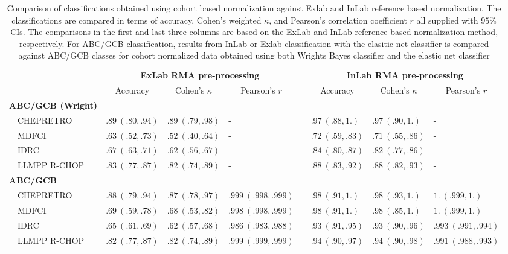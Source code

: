 \documentclass[10pt,letterpaper]{article}
\begin{document}
%
\begin{table}[!tbp]
	\begin{adjustwidth}{-1in}{0in}
		{\scriptsize
			\caption{Comparison of classifications obtained using cohort based
				normalization against Exlab and InLab reference based normalization.
				The classifications are compared in terms of accuracy,
				Cohen's weighted $\kappa$, and Pearson's correlation coefficient $r$ all
				supplied with $95\%$ CIs. The comparisons in the first and last three columns
				are based on the ExLab and InLab reference based
				normalization method, respectively. For ABC/GCB classification, results
				from InLab or Exlab classification with the elasitic net classifier is 
				compared against ABC/GCB classes for cohort normalized data obtained using both
				Wrights Bayes classifier and the elastic net classifier\label{tab:classALL}} 
			\begin{center}
				\begin{tabular}{llllclll}
					\hline\hline
					\multicolumn{1}{l}{\bfseries }&\multicolumn{3}{c}{\bfseries ExLab RMA pre-processing}&\multicolumn{1}{c}{\bfseries }&\multicolumn{3}{c}{\bfseries InLab RMA pre-processing}\tabularnewline
					\cline{2-4} \cline{6-8}
					\multicolumn{1}{l}{}&\multicolumn{1}{c}{Accuracy}&\multicolumn{1}{c}{Cohen's $\kappa$}&\multicolumn{1}{c}{Pearson's $r$}&\multicolumn{1}{c}{}&\multicolumn{1}{c}{Accuracy}&\multicolumn{1}{c}{Cohen's $\kappa$}&\multicolumn{1}{c}{Pearson's $r$}\tabularnewline
					\hline
					{\bfseries ABC/GCB (Wright)}&&&&&&&\tabularnewline
					~~CHEPRETRO&$.89~(.80, .94)$&$.89~(.79, .98)$&-&&$.97~(.88, 1.)$&$.97~(.90, 1.)$&-\tabularnewline
					~~MDFCI&$.63~(.52, .73)$&$.52~(.40, .64)$&-&&$.72~(.59, .83)$&$.71~(.55, .86)$&-\tabularnewline
					~~IDRC&$.67~(.63, .71)$&$.62~(.56, .67)$&-&&$.84~(.80, .87)$&$.82~(.77, .86)$&-\tabularnewline
					~~LLMPP R-CHOP&$.83~(.77, .87)$&$.82~(.74, .89)$&-&&$.88~(.83, .92)$&$.88~(.82, .93)$&-\tabularnewline
					\hline
					{\bfseries ABC/GCB}&&&&&&&\tabularnewline
					~~CHEPRETRO&$.88~(.79, .94)$&$.87~(.78, .97)$&$.999~(.998, .999)$&&$.98~(.91, 1.)$&$.98~(.93, 1.)$&$1.~(.999, 1.)$\tabularnewline
					~~MDFCI&$.69~(.59, .78)$&$.68~(.53, .82)$&$.998~(.998, .999)$&&$.98~(.91, 1.)$&$.98~(.85, 1.)$&$1.~(.999, 1.)$\tabularnewline
					~~IDRC&$.65~(.61, .69)$&$.62~(.57, .68)$&$.986~(.983, .988)$&&$.93~(.91, .95)$&$.93~(.90, .96)$&$.993~(.991, .994)$\tabularnewline
					~~LLMPP R-CHOP&$.82~(.77, .87)$&$.82~(.74, .89)$&$.999~(.999, .999)$&&$.94~(.90, .97)$&$.94~(.90, .98)$&$.991~(.988, .993)$\tabularnewline

\end{tabular}
\end{center}}
\end{adjustwidth}
\end{table}
\end{document}
